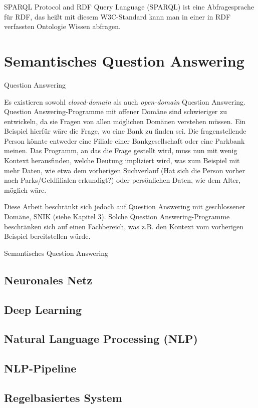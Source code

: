 SPARQL Protocol and RDF Query Language (SPARQL) ist eine Abfragesprache für RDF, das heißt mit diesem W3C-Standard kann man in einer in RDF verfassten Ontologie Wissen abfragen.

\section{Semantisches Question Answering}

\begin{definition}{Question Answering}
\end{definition}

Es existieren sowohl \emph{closed-domain} als auch \emph{open-domain} Question Answering.
Question Answering-Programme mit offener Domäne sind schwieriger zu entwickeln,
da sie Fragen von allen möglichen Domänen verstehen müssen.
Ein Beispiel hierfür wäre die Frage, wo eine Bank zu finden sei.
Die fragenstellende Person könnte entweder eine Filiale einer Bankgesellschaft oder eine Parkbank meinen.
Das Programm, an das die Frage gestellt wird, muss nun mit wenig Kontext herausfinden,
welche Deutung impliziert wird, was zum Beispiel mit mehr Daten,
wie etwa dem vorherigen Suchverlauf (Hat sich die Person vorher nach Parks/Geldfilialen erkundigt?)
oder persönlichen Daten, wie dem Alter, möglich wäre.

Diese Arbeit beschränkt sich jedoch auf Question Answering mit geschlossener Domäne, SNIK (siehe Kapitel 3).
Solche Question Answering-Programme beschränken sich auf einen Fachbereich,
was z.B. den Kontext vom vorherigen Beispiel bereitstellen würde.

\begin{definition}{Semantisches Question Answering}
\end{definition}

\subsection{Neuronales Netz}



\subsection{Deep Learning}



\subsection{Natural Language Processing (NLP)}



\subsection{NLP-Pipeline}



\subsection{Regelbasiertes System}

